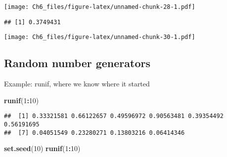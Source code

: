 \documentclass[
]{article}
\newenvironment{Shaded}{\begin{snugshade}}{\end{snugshade}}
\newcommand{\AttributeTok}[1]{\textcolor[rgb]{0.13,0.29,0.53}{#1}}
\newcommand{\DecValTok}[1]{\textcolor[rgb]{0.00,0.00,0.81}{#1}}
\newcommand{\FunctionTok}[1]{\textcolor[rgb]{0.13,0.29,0.53}{\textbf{#1}}}
\newcommand{\NormalTok}[1]{#1}
\newcommand{\OtherTok}[1]{\textcolor[rgb]{0.56,0.35,0.01}{#1}}
\newcommand{\SpecialCharTok}[1]{\textcolor[rgb]{0.81,0.36,0.00}{\textbf{#1}}}
\begin{document}
\texttt{[image: Ch6\_files/figure-latex/unnamed-chunk-28-1.pdf]}

\begin{Shaded}
\end{Shaded}

\begin{verbatim}
## [1] 0.3749431
\end{verbatim}

\begin{Shaded}
\end{Shaded}

\texttt{[image: Ch6\_files/figure-latex/unnamed-chunk-30-1.pdf]}

\subsection{Random number generators}\label{random-number-generators}

Example: runif, where we know where it started

\begin{Shaded}
\begin{Highlighting}[]
\FunctionTok{runif}\NormalTok{(}\DecValTok{1}\SpecialCharTok{:}\DecValTok{10}\NormalTok{)}
\end{Highlighting}
\end{Shaded}

\begin{verbatim}
##  [1] 0.33321581 0.66122657 0.49596972 0.90563481 0.39354492 0.56191695
##  [7] 0.04051549 0.23280271 0.13803216 0.06414346
\end{verbatim}

\begin{Shaded}
\begin{Highlighting}[]
\FunctionTok{set.seed}\NormalTok{(}\DecValTok{10}\NormalTok{)}
\FunctionTok{runif}\NormalTok{(}\DecValTok{1}\SpecialCharTok{:}\DecValTok{10}\NormalTok{)}
\end{Highlighting}
\end{Shaded}
\end{document}
